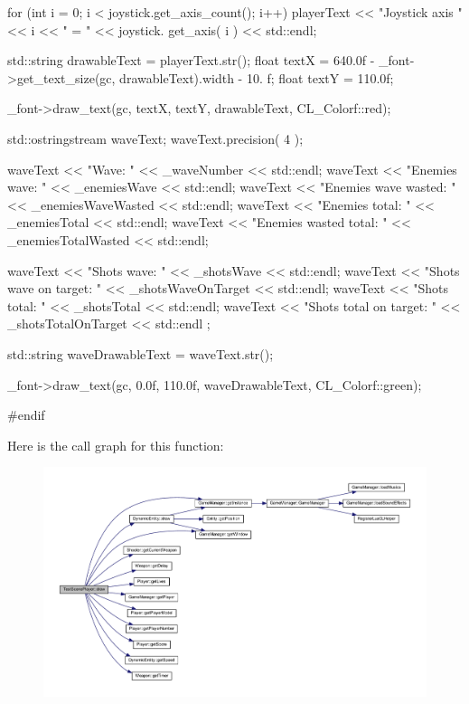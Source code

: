 \begin{DoxyCode}
{{                for (int i = 0; i < joystick.get_axis_count(); i++)
                {
                        playerText << "Joystick axis " << i << " = " << joystick.
      get_axis( i ) << std::endl;
                }
        }

        std::string drawableText = playerText.str();
        float textX = 640.0f - _font->get_text_size(gc, drawableText).width - 10.
      f; 
        float textY = 110.0f;

        _font->draw_text(gc, textX, textY, drawableText, CL_Colorf::red);

        std::ostringstream waveText;
        waveText.precision( 4 );

        waveText << "Wave: " << _waveNumber << std::endl;
        waveText << "Enemies wave: " << _enemiesWave << std::endl;
        waveText << "Enemies wave wasted: " << _enemiesWaveWasted << std::endl;
        waveText << "Enemies total: " << _enemiesTotal << std::endl;
        waveText << "Enemies wasted total: " << _enemiesTotalWasted << std::endl;
      
        waveText << "Shots wave: " << _shotsWave << std::endl;
        waveText << "Shots wave on target: " << _shotsWaveOnTarget << std::endl;
        waveText << "Shots total: " << _shotsTotal << std::endl;
        waveText << "Shots total on target: " << _shotsTotalOnTarget << std::endl
      ;

        std::string waveDrawableText = waveText.str();

        _font->draw_text(gc, 0.0f, 110.0f, waveDrawableText, CL_Colorf::green);

#endif
}
\end{DoxyCode}


Here is the call graph for this function:
\nopagebreak
\begin{figure}[H]
\begin{center}
\leavevmode
\includegraphics[width=400pt]{d1/d1a/class_test_scene_player_a17140146d2a39f10eb3aed81c067ec24_cgraph}
\end{center}
\end{figure}


